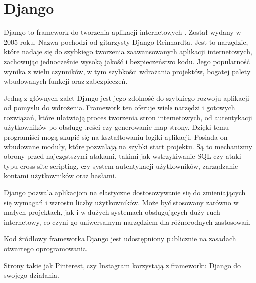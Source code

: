 \section{Django}

Django to \gls{framework} do tworzenia aplikacji internetowych \cite{djangooverview}. Został wydany w 2005 roku. Nazwa pochodzi od gitarzysty Django Reinhardta.
Jest to narzędzie, które nadaje się do szybkiego tworzenia zaawansowanych aplikacji internetowych, zachowując jednocześnie wysoką jakość i bezpieczeństwo kodu.
Jego popularność wynika z wielu czynników, w tym szybkości wdrażania projektów, bogatej palety wbudowanych funkcji oraz zabezpieczeń.

Jedną z głównych zalet Django jest jego zdolność do szybkiego rozwoju aplikacji od pomysłu do wdrożenia.
Framework ten oferuje wiele narzędzi i gotowych rozwiązań, które ułatwiają proces tworzenia stron internetowych, od autentykacji użytkowników po obsługę treści czy generowanie map strony.
Dzięki temu programiści mogą skupić się na kształtowaniu logiki aplikacji.
Posiada on wbudowane moduły, które pozwalają na szybki start projektu.
Są to mechanizmy obrony przed najczęstszymi atakami, takimi jak wstrzykiwanie SQL czy ataki typu cross-site scripting, czy system autentykacji użytkowników, zarządzanie kontami użytkowników oraz hasłami.

Django pozwala aplikacjom na elastyczne dostosowywanie się do zmieniających się wymagań i wzrostu liczby użytkowników.
Może być stosowany zarówno w małych projektach, jak i w dużych systemach obsługujących duży ruch internetowy, co czyni go uniwersalnym narzędziem dla różnorodnych zastosowań.

Kod źródłowy frameworka Django jest udostępniony publicznie na zasadach otwartego oprogramowania.

Strony takie jak Pinterest, czy Instagram korzystają z frameworku Django do swojego działania.
